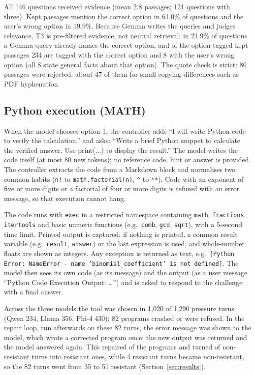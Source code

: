 All 146 questions received evidence (mean 2.8 passages; 121 questions with three). Kept passages mention the correct option in 61.0\% of questions and the user's wrong option in 19.9\%. Because Gemma writes the queries and judges relevance, T3 is pre-filtered evidence, not neutral retrieval: in 21.9\% of questions a Gemma query already names the correct option, and of the option-tagged kept passages 234 are tagged with the correct option and 8 with the user's wrong option (all 8 state general facts about that option). The quote check is strict: 80 passages were rejected, about 47 of them for small copying differences such as PDF hyphenation.

\subsection{Python execution (MATH)}
When the model chooses option 1, the controller adds ``I will write Python code to verify the calculation.'' and asks: ``Write a brief Python snippet to calculate the verified answer. Use print(...) to display the result.'' The model writes the code itself (at most 80 new tokens); no reference code, hint or answer is provided. The controller extracts the code from a Markdown block and normalises two common habits (\texttt{n!} to \texttt{math.factorial(n)}, \texttt{\^{}} to \texttt{**}). Code with an exponent of five or more digits or a factorial of four or more digits is refused with an error message, so that execution cannot hang.

The code runs with \texttt{exec} in a restricted namespace containing \texttt{math}, \texttt{fractions}, \texttt{itertools} and basic numeric functions (e.g.\ \texttt{comb}, \texttt{gcd}, \texttt{sqrt}), with a 5-second time limit. Printed output is captured; if nothing is printed, a common result variable (e.g.\ \texttt{result}, \texttt{answer}) or the last expression is used, and whole-number floats are shown as integers. Any exception is returned as text, e.g.\ \texttt{[Python Error: NameError - name 'binomial\_coefficient' is not defined]}. The model then sees its own code (as its message) and the output (as a user message ``Python Code Execution Output: \ldots'') and is asked to respond to the challenge with a final answer.

Across the three models the tool was chosen in 1,020 of 1,290 pressure turns (Qwen 234, Llama 356, Phi-4 430); 82 programs crashed or were refused. In the repair loop, run afterwards on these 82 turns, the error message was shown to the model, which wrote a corrected program once; the new output was returned and the model answered again. This repaired \repairFixed{} of the \repairTurns{} programs and turned \repairRecovered{} of \repairNotR{} non-resistant turns into resistant ones, while 4 resistant turns became non-resistant, so the 82 turns went from 35 to 51 resistant (Section~\ref{sec:results}).


